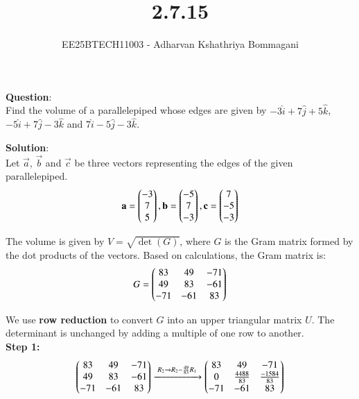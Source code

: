 \documentclass[journal]{IEEEtran}
\begin{document}

\vspace{3cm}

\title{2.7.15}
\author{EE25BTECH11003 - Adharvan Kshathriya Bommagani}
{\newpage\maketitle}

\renewcommand{\thefigure}{\theenumi}
\renewcommand{\thetable}{\theenumi}
\setlength{\intextsep}{10pt} %
\textbf{Question}:\\
Find the volume of a parallelepiped whose edges are given by $-3\hat{i} + 7\hat{j} + 5\hat{k}$, $-5\hat{i} + 7\hat{j} - 3\hat{k}$ and $7\hat{i} - 5\hat{j} - 3\hat{k}$.
  
\bigskip

\textbf{Solution}:\\

Let $\vec{a}$, $\vec{b}$ and $\vec{c}$ be three vectors representing the edges of the given parallelepiped.
\begin{align}
    \mathbf{a} = \begin{pmatrix} - 3 \\ 7 \\ 5 \end{pmatrix},  
    \mathbf{b} = \begin{pmatrix} - 5 \\ 7 \\ - 3 \end{pmatrix},
     \mathbf{c} = \begin{pmatrix} 7 \\ -5 \\ -3 \end{pmatrix}
\end{align}

The volume is given by $V = \sqrt{\det(G)}$, where $G$ is the Gram matrix formed by the dot products of the vectors. Based on calculations, the Gram matrix is:
$$
G = \begin{pmatrix}
83 & 49 & -71 \\
49 & 83 & -61 \\
-71 & -61 & 83
\end{pmatrix}
$$

We use \textbf{row reduction} to convert $G$ into an upper triangular matrix $U$.  
The determinant is unchanged by adding a multiple of one row to another.\\

\textbf{Step 1:}
\begin{align*}
\begin{pmatrix}
83 & 49 & -71 \\
49 & 83 & -61 \\
-71 & -61 & 83
\end{pmatrix}
\xrightarrow{\;R_2 \to R_2 - \frac{49}{83}R_1\;}
\begin{pmatrix}
83 & 49 & -71 \\
0 & \tfrac{4488}{83} & \tfrac{-1584}{83} \\
-71 & -61 & 83
\end{pmatrix}
\end{align*}
\end{document}
